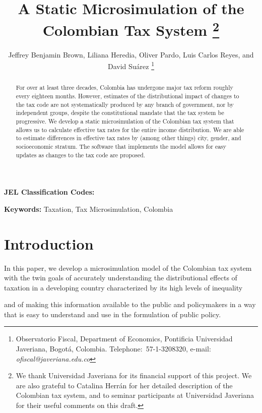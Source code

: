 \documentclass[12pt]{article}
\begin{document}
\title{A Static Microsimulation of the Colombian Tax System
  \thanks{We thank Universidad Javeriana for its financial support of this project.
    We are also grateful to Catalina Herr\'{a}n for her detailed description of the Colombian tax system,
    and to seminar participants at Universidad Javeriana for their useful comments on this draft.}}
\author{Jeffrey Benjamin Brown, Liliana Heredia, Oliver Pardo, Luis Carlos Reyes, and David Su\'{a}rez
  \thanks{Observatorio Fiscal,
    Department of Economics, Pontificia Universidad Javeriana, Bogot\'{a}, Colombia.
    Telephone:\ 57-1-3208320,
    e-mail: \textit{ofiscal@javeriana.edu.co}}}

\maketitle
\begin{abstract}
  For over at least three decades,
  Colombia has undergone major tax reform roughly every eighteen months.
  However, estimates of the distributional impact of changes to the tax code are not systematically produced by any branch of government,
  nor by independent groups,
  despite the constitutional mandate that the tax system be progressive.
  We develop a static microsimulation of the Colombian tax system
  that allows us to calculate effective tax rates
  for the entire income distribution.
  We are able to estimate differences in effective tax rates by
  (among other things) city, gender, and socioeconomic stratum.
  The software that implements the model allows for
  easy updates as changes to the tax code are proposed.
 \end{abstract}

\textbf{JEL Classification Codes:}

\textbf{Keywords:} Taxation, Tax Microsimulation, Colombia
\pagebreak%
\doublespacing

\section{Introduction}

In this paper, we develop a microsimulation model of the Colombian tax system
with the twin goals of
accurately understanding the distributional effects of taxation
in a developing country characterized by its high levels of inequality
\iffalse
    [[SOMEONE:
    and informality?
    I suspect the answer is that no,
    the simulation currently has nothing to say about informality.
    While we do have a ``making pension contributions'' variable,
    we don't even report it in the final output tables,
    and the word ``formal'' only shows up twice in the simulation code,
    in the very early stages, as if we thought we might use it but never did.
    ]],
\fi
and of making this information available to the public and policymakers
in a way that is easy to understand and use in the formulation of public policy.
\end{document}
